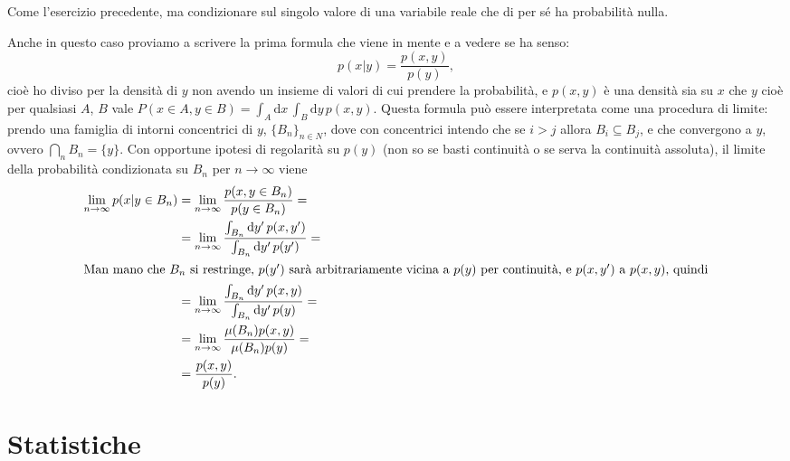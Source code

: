 %
\begin{exercise}
    Come l'esercizio precedente, ma condizionare sul singolo valore di una
    variabile reale che di per sé ha probabilità nulla.
\end{exercise}
%
\begin{solution}
    Anche in questo caso proviamo a scrivere la prima formula che viene in
    mente e a vedere se ha senso:
    \begin{equation*}
        p(x|y) = \frac{p(x,y)}{p(y)},
    \end{equation*}
    cioè ho diviso per la densità di $y$ non avendo un insieme di valori di
    cui prendere la probabilità, e $p(x, y)$ è una densità sia su $x$ che $y$
    cioè per qualsiasi $A$, $B$ vale $P(x \in A, y \in B) = \int_A \mathrm dx\,
    \int_B \mathrm dy\, p(x, y)$.
    Questa formula può essere interpretata come una procedura di limite: prendo
    una famiglia di intorni concentrici di $y$, $\{B_n\}_{n\in N}$, dove con
    concentrici intendo che se $i > j$ allora $B_i \subseteq B_j$, e che
    convergono a $y$, ovvero $\bigcap_n B_n = \{y\}$. Con opportune ipotesi di
    regolarità su $p(y)$ (non so se basti continuità o se serva la continuità
    assoluta), il limite della probabilità condizionata su $B_n$ per $n \to
    \infty$ viene
    \begin{align*}
        \lim_{n \to \infty} p(x|y \in B_n) &=
        \lim_{n \to \infty} \frac{p(x, y \in B_n)}{p(y \in B_n)} = \\
        &= \lim_{n \to \infty}
        \frac {\int_{B_n} \mathrm dy'\, p(x, y')}
        {\int_{B_n} \mathrm dy'\, p(y')} = \\
        \intertext{Man mano che $B_n$ si restringe, $p(y')$ sarà arbitrariamente
        vicina a $p(y)$ per continuità, e $p(x, y')$ a $p(x, y)$, quindi}
        &= \lim_{n \to \infty}
        \frac {\int_{B_n} \mathrm dy'\, p(x, y)}
        {\int_{B_n} \mathrm dy'\, p(y)} = \\
        &= \lim_{n \to \infty}
        \frac {\mu(B_n) p(x, y)} {\mu(B_n) p(y)} = \\
        &= \frac{p(x,y)}{p(y)}.
    \end{align*}
\end{solution}

\section{Statistiche}

